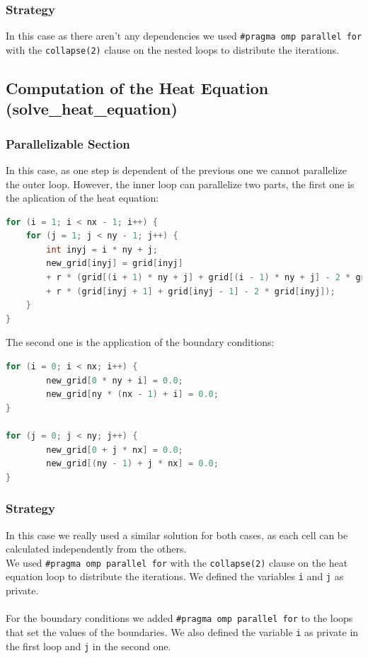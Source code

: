 \documentclass[12pt]{article}
\begin{document}
\subsubsection{Strategy}
In this case as there aren't any dependencies we used \texttt{\#pragma omp parallel for} with the \texttt{collapse(2)} clause on the nested loops to distribute the iterations.

\pagebreak
\subsection{Computation of the Heat Equation (solve\_heat\_equation)}

\subsubsection{Parallelizable Section}
In this case, as one step is dependent of the previous one we cannot parallelize the outer loop. However, the inner loop can parallelize two parts, the first one is the aplication of the heat equation:
\begin{lstlisting}[language=C, basicstyle=\scriptsize\ttfamily]
for (i = 1; i < nx - 1; i++) {
	for (j = 1; j < ny - 1; j++) {
		int inyj = i * ny + j;
		new_grid[inyj] = grid[inyj]
		+ r * (grid[(i + 1) * ny + j] + grid[(i - 1) * ny + j] - 2 * grid[inyj])
		+ r * (grid[inyj + 1] + grid[inyj - 1] - 2 * grid[inyj]);
	}
}
\end{lstlisting}
The second one is the application of the boundary conditions:
\begin{lstlisting}[language=C, basicstyle=\scriptsize\ttfamily]
for (i = 0; i < nx; i++) {
		new_grid[0 * ny + i] = 0.0;
		new_grid[ny * (nx - 1) + i] = 0.0;
}

for (j = 0; j < ny; j++) {
		new_grid[0 + j * nx] = 0.0;
		new_grid[(ny - 1) + j * nx] = 0.0;
}

\end{lstlisting}

\subsubsection{Strategy}
In this case we really used a similar solution for both cases, as each cell can be calculated independently from the others.
\\
We used \texttt{\#pragma omp parallel for} with the \texttt{collapse(2)} clause on the heat equation loop to distribute the iterations. We defined the variables \texttt{i} and \texttt{j} as private.
\\\\
For the boundary conditions we added \texttt{\#pragma omp parallel for} to the loops that set the values of the boundaries. We also defined the variable \texttt{i} as private in the first loop and \texttt{j} in the second one.
\end{document}
